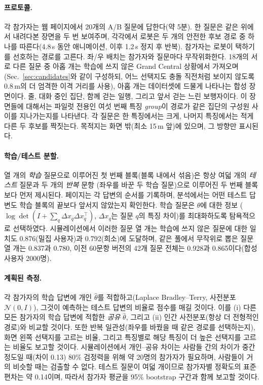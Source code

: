 \paragraph{프로토콜.}
각 참가자는 웹 페이지에서 20개의 A/B 질문에 답한다(약 5분). 한 질문은 같은 위에서 내려다본 장면을 두 번 보여주며, 각각에서
로봇은 두 개의 안전한 후보 경로 중 하나를 따른다(4.8\,s 동안 애니메이션, 이후 1.2\,s 정지 후 반복). 참가자는 로봇이
택하기를 선호하는 경로를 고른다. 좌/우 배치는 참가자와 질문마다 무작위화한다. 18개의 서로 다른 질문 중 아홉 개는
학습에 쓰지 않은 Grand Central 상황에서 가져오며(Sec.~\ref{sec:candidates}와 같이 구성하되, 어느 선택지도 충돌 직전처럼 보이지 않도록
0.8\,m의 더 엄격한 이격 거리를 사용), 아홉 개는 데이터셋에 드물게 나타나는 합성 장면이다. 줄, 대화 중인 집단, 함께 걷는 일행,
그리고 앞서 걷는 느린 보행자이다. 이 장면들에 대해서는 파일럿 전용인 여섯 번째 특징 \emph{group}이 경로가 같은 집단의
구성원 사이를 지나가는지를 나타낸다. 각 질문은 한 특징에서는 크게, 나머지 특징에서는 적게 다른 두 후보를 짝짓는다. 목적지는
화면 밖(최소 15\,m 앞)에 있으며, 그 방향만 표시된다.

\paragraph{학습/테스트 분할.}
열 개의 \emph{학습} 질문으로 이루어진 첫 번째 블록(블록 내에서 섞음)은 항상 여덟 개의 \emph{테스트} 질문과 두 개의 \emph{반복} 문항
(좌우를 바꾼 두 학습 질문)으로 이루어진 두 번째 블록보다 먼저 제시된다. 페이지는 각 답변의 순서를 기록하며,
분석에서는 어떤 테스트 답변도 학습 블록의 끝보다 앞서지 않았는지 확인한다. 학습 질문은 $\theta$에 대한 정보
($\log\det(I + \sum_q \Delta x_q \Delta x_q^\top)$, $\Delta x_q$는 질문 $q$의 특징 차이)를 최대화하도록 탐욕적으로 선택하였다.
시뮬레이션에서 이러한 질문 열 개는 학습에 쓰지 않은 질문에 대한 일치도 0.876(밀집 사용자)과 0.792(희소)에 도달하며, 같은 풀에서 무작위로 뽑은 질문 열 개는
0.837과 0.780, 이전 60문항 버전의 42개 질문 전체는 0.928과 0.865이다(합성 사용자 2000명).

\paragraph{계획된 측정.}
각 참가자의 학습 답변에 개인 $\hat\theta$를 적합하고(Laplace Bradley--Terry, 사전분포 $\mathcal{N}(0,I)$), 그것이 예측하는 테스트 답변의
비율로 점수를 매길 것이다. 이를 (i) 다른 모든 참가자의 학습 답변에 적합한 \emph{공유} $\hat\theta$, 그리고
(ii) 인간 사전분포(항상 더 전형적인 경로)와 비교할 것이다. 또한 반복 일관성(좌우를 바꿨을 때 같은 경로를 선택하는지),
화면 왼쪽 선택지를 고르는 비율, 그리고 특징별로 해당 특징이 더 높은 선택지를 고르는 비율도 보고할 것이다.
시뮬레이션에서 개인--공유 차이는 사람들 간의 차이가 중간 정도일 때(차이 0.13) 80\% 검정력을 위해 약 20명의 참가자가 필요하며,
사람들이 거의 비슷할 때는 검출할 수 없다. 테스트 질문이 여덟 개이므로 참가자별 정확도의 표준편차는
약 0.14이며, 따라서 참가자 평균을 95\% bootstrap 구간과 함께 보고할 것이다.
